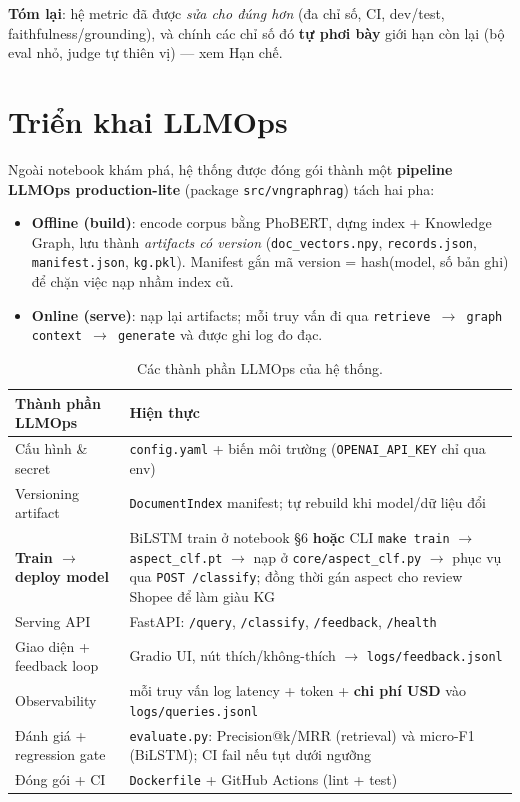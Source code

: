 \documentclass[12pt,a4paper]{article}
\begin{document}
\textbf{Tóm lại}: hệ metric đã được \textit{sửa cho đúng hơn} (đa chỉ số, CI, dev/test, faithfulness/grounding), và chính các chỉ số đó \textbf{tự phơi bày} giới hạn còn lại (bộ eval nhỏ, judge tự thiên vị) --- xem Hạn chế.

\section{Triển khai LLMOps}
\label{sec:llmops}

Ngoài notebook khám phá, hệ thống được đóng gói thành một \textbf{pipeline LLMOps production-lite} (package \texttt{src/vngraphrag}) tách hai pha:

\begin{itemize}
  \item \textbf{Offline (build)}: encode corpus bằng PhoBERT, dựng index + Knowledge Graph, lưu thành \textit{artifacts có version} (\texttt{doc\_vectors.npy}, \texttt{records.json}, \texttt{manifest.json}, \texttt{kg.pkl}). Manifest gắn mã version = hash(model, số bản ghi) để chặn việc nạp nhầm index cũ.
  \item \textbf{Online (serve)}: nạp lại artifacts; mỗi truy vấn đi qua \texttt{retrieve $\to$ graph context $\to$ generate} và được ghi log đo đạc.
\end{itemize}

\begin{table}[H]
\centering
\renewcommand{\arraystretch}{1.25}
\begin{tabular}{p{4.2cm}p{8.5cm}}
\toprule
\textbf{Thành phần LLMOps} & \textbf{Hiện thực} \\
\midrule
Cấu hình \& secret & \texttt{config.yaml} + biến môi trường (\texttt{OPENAI\_API\_KEY} chỉ qua env) \\
Versioning artifact & \texttt{DocumentIndex} manifest; tự rebuild khi model/dữ liệu đổi \\
\textbf{Train $\to$ deploy model} & BiLSTM train ở notebook §6 \textbf{hoặc} CLI \texttt{make train} $\to$ \texttt{aspect\_clf.pt} $\to$ nạp ở \texttt{core/aspect\_clf.py} $\to$ phục vụ qua \texttt{POST /classify}; đồng thời gán aspect cho review Shopee để làm giàu KG \\
Serving API & FastAPI: \texttt{/query}, \texttt{/classify}, \texttt{/feedback}, \texttt{/health} \\
Giao diện + feedback loop & Gradio UI, nút thích/không-thích $\to$ \texttt{logs/feedback.jsonl} \\
Observability & mỗi truy vấn log latency + token + \textbf{chi phí USD} vào \texttt{logs/queries.jsonl} \\
Đánh giá + regression gate & \texttt{evaluate.py}: Precision@k/MRR (retrieval) và micro-F1 (BiLSTM); CI fail nếu tụt dưới ngưỡng \\
Đóng gói + CI & \texttt{Dockerfile} + GitHub Actions (lint + test) \\
\bottomrule
\end{tabular}
\caption{Các thành phần LLMOps của hệ thống.}
\end{table}
\end{document}
